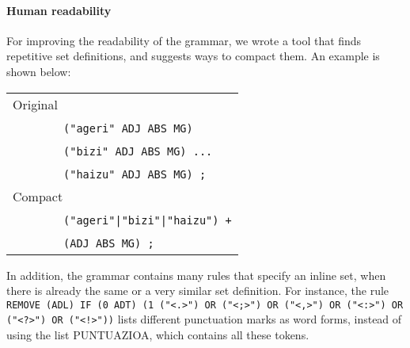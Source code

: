 \documentclass[11pt]{article}
\begin{document}




\paragraph{Human readability}
For improving the readability of the grammar, we wrote a tool that finds repetitive set definitions, and suggests ways to compact them. An example is shown below:

\begin{table}[h]
\begin{tabular}{l}
Original  \\
 ~~~~~~~~\texttt{("ageri" ADJ ABS MG)} \\
 ~~~~~~~~\texttt{("bizi" ADJ ABS MG) ...} \\
 ~~~~~~~~\texttt{("haizu" ADJ ABS MG) ;} \\
Compact \\
 ~~~~~~~~\texttt{("ageri"|"bizi"|"haizu") +} \\
 ~~~~~~~~\texttt{(ADJ ABS MG) ;}

\end{tabular}
\end{table}


In addition, the grammar contains many rules that specify an inline set, when there is already the same or a very similar set definition. For instance, the rule \texttt{REMOVE (ADL) IF (0 ADT) (1 ("<.>") OR ("<;>") OR ("<,>") OR ("<:>") OR ("<?>") OR ("<!>"))} lists different punctuation marks as word forms, instead of using the list PUNTUAZIOA, which contains all these tokens.
\end{document}
